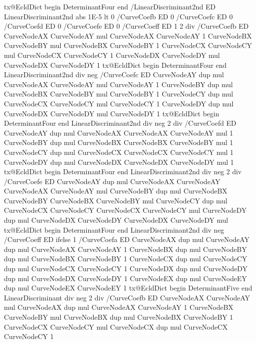 {{        tx@EcldDict begin DeterminantFour end /LinearDiscriminant2nd ED
        LinearDiscriminant2nd abs 1E-5 lt { %
          0 /CurveCoefb ED
          0 /CurveCoefc ED
          0 /CurveCoefd ED
          0 /CurveCoefe ED
          0 /CurveCoeff ED
        } {
          1 2 div /CurveCoefb ED
          CurveNodeAX CurveNodeAY mul CurveNodeAX CurveNodeAY 1
          CurveNodeBX CurveNodeBY mul CurveNodeBX CurveNodeBY 1
          CurveNodeCX CurveNodeCY mul CurveNodeCX CurveNodeCY 1
          CurveNodeDX CurveNodeDY mul CurveNodeDX CurveNodeDY 1
          tx@EcldDict begin DeterminantFour end LinearDiscriminant2nd div neg /CurveCoefc ED
          CurveNodeAY dup mul CurveNodeAX CurveNodeAY mul CurveNodeAY 1
          CurveNodeBY dup mul CurveNodeBX CurveNodeBY mul CurveNodeBY 1
          CurveNodeCY dup mul CurveNodeCX CurveNodeCY mul CurveNodeCY 1
          CurveNodeDY dup mul CurveNodeDX CurveNodeDY mul CurveNodeDY 1
          tx@EcldDict begin DeterminantFour end LinearDiscriminant2nd div neg 2 div /CurveCoefd ED
          CurveNodeAY dup mul CurveNodeAX CurveNodeAX CurveNodeAY mul 1
          CurveNodeBY dup mul CurveNodeBX CurveNodeBX CurveNodeBY mul 1
          CurveNodeCY dup mul CurveNodeCX CurveNodeCX CurveNodeCY mul 1
          CurveNodeDY dup mul CurveNodeDX CurveNodeDX CurveNodeDY mul 1
          tx@EcldDict begin DeterminantFour end LinearDiscriminant2nd div neg 2 div /CurveCoefe ED
          CurveNodeAY dup mul CurveNodeAX CurveNodeAY CurveNodeAX CurveNodeAY mul
          CurveNodeBY dup mul CurveNodeBX CurveNodeBY CurveNodeBX CurveNodeBY mul
          CurveNodeCY dup mul CurveNodeCX CurveNodeCY CurveNodeCX CurveNodeCY mul
          CurveNodeDY dup mul CurveNodeDX CurveNodeDY CurveNodeDX CurveNodeDY mul
          tx@EcldDict begin DeterminantFour end LinearDiscriminant2nd div neg /CurveCoeff ED
        } ifelse
      } {
        1 /CurveCoefa ED
        CurveNodeAX dup mul CurveNodeAY dup mul CurveNodeAX CurveNodeAY 1
        CurveNodeBX dup mul CurveNodeBY dup mul CurveNodeBX CurveNodeBY 1
        CurveNodeCX dup mul CurveNodeCY dup mul CurveNodeCX CurveNodeCY 1
        CurveNodeDX dup mul CurveNodeDY dup mul CurveNodeDX CurveNodeDY 1
        CurveNodeEX dup mul CurveNodeEY dup mul CurveNodeEX CurveNodeEY 1
        tx@EcldDict begin DeterminantFive end LinearDiscriminant div neg 2 div /CurveCoefb ED
        CurveNodeAX CurveNodeAY mul CurveNodeAX dup mul CurveNodeAX CurveNodeAY 1
        CurveNodeBX CurveNodeBY mul CurveNodeBX dup mul CurveNodeBX CurveNodeBY 1
        CurveNodeCX CurveNodeCY mul CurveNodeCX dup mul CurveNodeCX CurveNodeCY 1
}}

